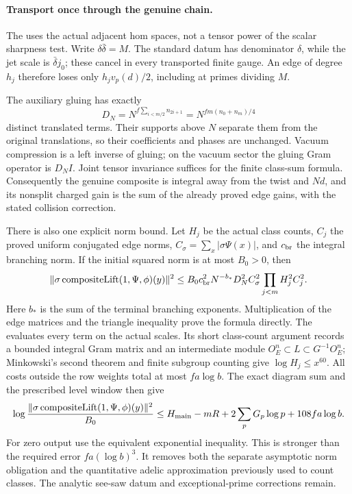 \paragraph{Transport once through the genuine chain.}
The  uses the actual adjacent hom spaces, not a tensor power of the
scalar sharpness test. Write \(\delta\bar\delta=M\). The standard
datum has denominator \(\delta\), while the jet scale is
\(\bar\delta j_0\); these cancel in every transported finite gauge.
An edge of degree \(h_j\) therefore loses only
\(h_jv_p(d)/2\), including at primes dividing \(M\).

The auxiliary gluing has exactly
\[
 D_N=N^{f\sum_{i<m/2}n_{2i+1}}
     =N^{fm(n_0+n_m)/4}
\]
distinct translated terms. Their supports above \(N\) separate them
from the original translations, so their coefficients and phases
are unchanged. Vacuum compression is a left inverse of gluing; on
the vacuum sector the gluing Gram operator is \(D_N I\).
Joint tensor invariance suffices for the finite class-sum formula.
Consequently the genuine composite is integral away from the twist
and \(Nd\), and its nonsplit charged gain is the sum of the already
proved edge gains, with the stated collision correction.

There is also one explicit norm bound. Let \(H_j\) be the actual
class counts, \(C_j\) the proved uniform conjugated edge norms,
\(C_\sigma=\sum_x|\sigma\Psi(x)|\), and \(c_{\rm br}\) the
integral branching norm. If the initial squared norm is at most
\(B_0>0\), then
\[
 \|\sigma\operatorname{compositeLift}(1,\Psi,\phi)(y)\|^2
 \le B_0c_{\rm br}^2N^{-b_*}D_N^2C_\sigma^2
                          \prod_{j<m}H_j^2C_j^2.
\]
Here \(b_*\) is the sum of the terminal branching exponents.
Multiplication of the edge matrices and the triangle inequality
prove the formula directly. The
evaluates every term on the actual scales. Its short class-count
argument records a bounded integral Gram matrix and an intermediate
module \(O_E^n\subset L\subset G^{-1}O_E^n\); Minkowski's second
theorem and finite subgroup counting give \(\log H_j\le x^{60}\).
All costs outside the row weights total at most \(fa\log b\).
The exact diagram sum and the prescribed level window then give
\[
 \log\frac{\|\sigma\operatorname{compositeLift}(1,\Psi,\phi)(y)\|^2}
                 {B_0}
 \le H_{\rm main}-mR+2\sum_pG_p\log p+108fa\log b.
\]
For zero output use the equivalent exponential inequality.
This is stronger than the required error \(fa(\log b)^3\).
It removes both the separate asymptotic norm obligation and the
quantitative adelic approximation previously used to count classes.
The analytic see-saw datum and exceptional-prime corrections remain.

